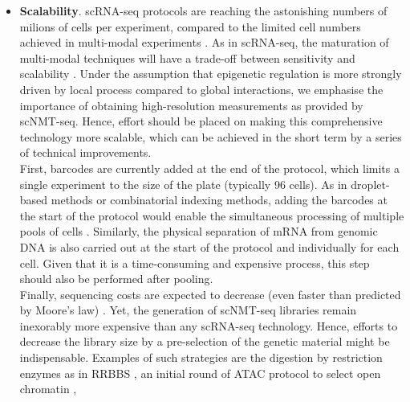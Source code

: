 \begin{itemize}

	\item \textbf{Scalability}. scRNA-seq protocols are reaching the astonishing numbers of milions of cells per experiment, compared to the limited cell numbers achieved in multi-modal experiments \cite{Cao2019,Cao2018,Guo2017}. As in scRNA-seq, the maturation of multi-modal techniques will have a trade-off between sensitivity and scalability \cite{Chappell2018}. Under the assumption that epigenetic regulation is more strongly driven by local process compared to global interactions\cite{XX}, we emphasise the importance of obtaining high-resolution measurements as provided by scNMT-seq. Hence, effort should be placed on making this comprehensive technology more scalable, which can be achieved in the short term by a series of technical improvements.\\
	First, barcodes are currently added at the end of the protocol, which limits a single experiment to the size of the plate (typically 96 cells). As in droplet-based methods or combinatorial indexing methods, adding the barcodes at the start of the protocol would enable the simultaneous processing of multiple pools of cells \cite{droplet,sci-met}.
	Similarly, the physical separation of mRNA from genomic DNA is also carried out at the start of the protocol and individually for each cell. Given that it is a time-consuming and expensive process, this step should also be performed after pooling.\\
	Finally, sequencing costs are expected to decrease (even faster than predicted by Moore's law) \cite{Svensson2018}. Yet, the generation of scNMT-seq libraries remain inexorably more expensive than any scRNA-seq technology. Hence, efforts to decrease the library size by a pre-selection of the genetic material might be indispensable. Examples of such strategies are the digestion by restriction enzymes as in RRBBS \cite{Guo2013}, an initial round of ATAC protocol to select open chromatin \cite{Spektor2018}, 


\end{itemize}
